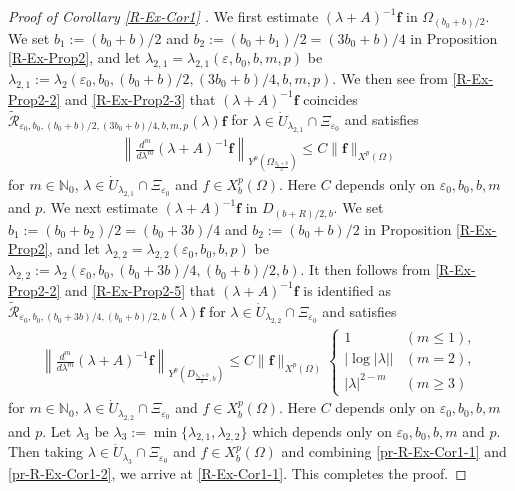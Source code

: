 \documentclass[dvipdfmx,12pt]{article}
\begin{document}
\begin{proof}[Proof of Corollary \ref{R-Ex-Cor1} ]
We first estimate $(\lambda+A)^{-1}\mathbf{f}$ in $\Omega_{(b_0+b)/2}$. We set $b_1:=(b_0+b)/2$ and $b_2:=(b_0+b_1)/2=(3b_0+b)/4$ in Proposition \ref{R-Ex-Prop2}, and let $\lambda_{2,1}=\lambda_{2,1}(\varepsilon,b_0,b,m,p)$ be $\lambda_{2,1}:=\lambda_{2}(\varepsilon_0,b_0,(b_0+b)/2,(3b_0+b)/4, b,m,p)$. We then see from \eqref{R-Ex-Prop2-2} and \eqref{R-Ex-Prop2-3} that $(\lambda+A)^{-1}\mathbf{f}$ coincides $\widetilde{\mathcal{R}}_{\varepsilon_0,b_0,(b_0+b)/2,(3b_0+b)/4, b,m,p}(\lambda)\mathbf{f}$ for $\lambda\in \Dot{U}_{\lambda_{2,1}}\cap \Xi_{\varepsilon_0}$ and satisfies 
\begin{gather}\label{pr-R-Ex-Cor1-1}
\left\| \frac{d^m}{d\lambda^m}(\lambda+A)^{-1}\mathbf{f}\right\|_{Y^p\left(\Omega_{\frac{b_0+b}{2}}\right)} 
\le C\|\mathbf{f}\|_{X^p(\Omega)}
\end{gather}
for $m\in\mathbb{N}_0$, $\lambda\in \Dot{U}_{\lambda_{2,1}}\cap \Xi_{\varepsilon_0}$ and $f\in X_b^p(\Omega)$. Here $C$ depends only on $\varepsilon_0,b_0, b, m$ and $p$.
We next estimate $(\lambda+A)^{-1}\mathbf{f}$ in $D_{(b+R)/2,b}$. We set $b_1:=(b_0+b_2)/2=(b_0+3b)/4$ and $b_2:=(b_0+b)/2$ in Proposition \ref{R-Ex-Prop2}, and let $\lambda_{2,2}=\lambda_{2,2}(\varepsilon_0,b_0,b,p)$ be $\lambda_{2,2}:=\lambda_{2}(\varepsilon_0,b_0,(b_0+3b)/4,(b_0+b)/2, b)$. It then follows from \eqref{R-Ex-Prop2-2} and \eqref{R-Ex-Prop2-5} that $(\lambda+A)^{-1}\mathbf{f}$ is identified as $\widetilde{\mathcal{R}}_{\varepsilon_0,b_0,(b_0+3b)/4,(b_0+b)/2, b}(\lambda)\mathbf{f}$ for $\lambda\in \Dot{U}_{\lambda_{2,2} }\cap \Xi_{\varepsilon_0}$ and satisfies 
\begin{gather}\label{pr-R-Ex-Cor1-2}
\left\| \frac{d^m}{d\lambda^m}(\lambda+A)^{-1}\mathbf{f}\right\|_{Y^p(D_{\frac{b_0+b}{2},b})} 
\le C\|\mathbf{f}\|_{X^p(\Omega)}
\begin{cases}
1 & (m\le 1), \\
\left|\log |\lambda|\right| & (m=2), \\
|\lambda|^{2-m} &(m\ge3)
\end{cases}
\end{gather}
for $m\in\mathbb{N}_0$, $\lambda\in \Dot{U}_{\lambda_{2,2} }\cap \Xi_{\varepsilon_0}$ and $f\in X_b^p(\Omega)$. Here $C$ depends only on $\varepsilon_0,b_0, b, m$ and $p$.  Let $\lambda_3$ be $\lambda_3:=\min\{\lambda_{2,1},\lambda_{2,2}\}$ which depends only on $\varepsilon_0,b_0, b, m$ and $p$. Then taking $\lambda\in \Dot{U}_{\lambda_{3}}\cap \Xi_{\varepsilon_0}$ and $f\in X_b^p(\Omega)$ and combining \eqref{pr-R-Ex-Cor1-1} and \eqref{pr-R-Ex-Cor1-2}, we arrive at \eqref{R-Ex-Cor1-1}.
This completes the proof.
\end{proof}
\end{document}
